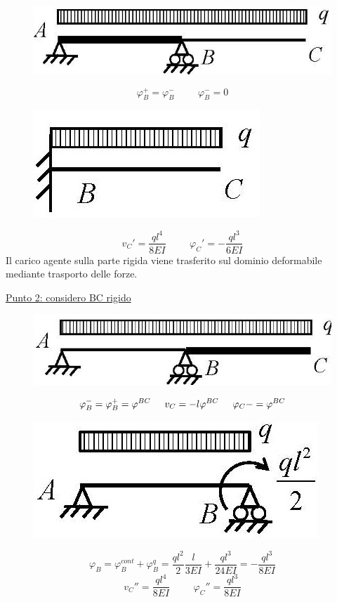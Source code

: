 \documentclass{article}
\begin{document}
\begin{adjustwidth}{2in}{}
\begin{figure}[H]
	\centering
	\includegraphics[width=0.3\linewidth]{"immagini/1.PARTE8_Pagina_21 (2)"}
\end{figure}

		\[ \varphi_B^+ = \varphi_B^- \hspace{1cm} \varphi_B^- = 0 \]
		
\begin{figure}[H]
	\centering
	\includegraphics[width=0.3\linewidth]{"immagini/1.PARTE8_Pagina_21 (3)"}
\end{figure}

		\[ v_C' = \dfrac{ql^4}{8EI} \hspace{1cm} \varphi_C'= -\dfrac{ql^3}{6EI}\]
		Il carico agente sulla parte rigida viene trasferito sul
		dominio deformabile mediante trasporto delle forze. \newline 
		
		\underline{Punto 2: considero BC rigido}
		
\begin{figure}[H]
	\centering
	\includegraphics[width=0.3\linewidth]{"immagini/1.PARTE8_Pagina_21 (4)"}
\end{figure}
		
		\[ \varphi_B^- = \varphi_B^+ = \varphi^{BC} \hspace{0.5cm} v_C = -l\varphi^{BC} \hspace{0.5cm} \varphi_C- = \varphi^{BC}  \]
		
\begin{figure}[H]
	\centering
	\includegraphics[width=0.3\linewidth]{"immagini/1.PARTE8_Pagina_21 (5)"}
\end{figure}

		\[ \varphi_B = \varphi_B^{cont} + \varphi_B^q = \dfrac{ql^2}{2} \dfrac{l}{3EI} + \dfrac{ql^3}{24EI} =- \dfrac{ql^3}{8EI} \]
		\[ v_C'' = \dfrac{ql^4}{8EI} \hspace{1cm}  \varphi_C'' = \dfrac{ql^3}{8EI}\]
		

\end{adjustwidth}
\end{document}
